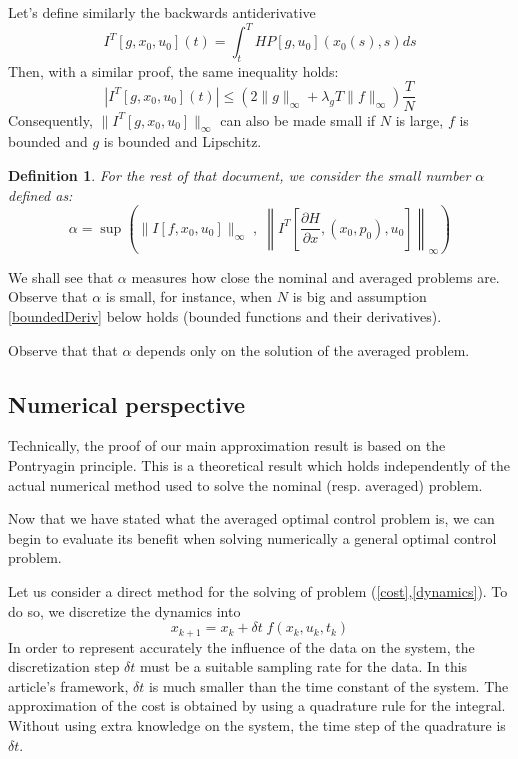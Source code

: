 \documentclass[a4paper,10pt]{article}
\newtheorem{definition}{Definition}
\begin{document}
Let's define similarly the backwards antiderivative
\begin{equation}
    I^{T}[g,x_{0},u_{0}](t)=\int_{t}^{T}HP[g,u_{0}](x_{0}(s),s)ds
    \label{ITcontrol}
\end{equation}
Then, with a similar proof, the same inequality holds:
\begin{equation}
    |I^{T}[g,x_{0},u_{0}](t)| \le (2 \|g\|_{\infty} + \lambda_{g}T  \|f\|_{\infty})\frac{T}{N}
    \label{boundIcontrol2}
\end{equation}
Consequently, $\|I^{T}[g,x_{0},u_{0}]\|_{\infty}$ can also be made 
small  if $N$ is large, $f$ is bounded and $g$ is bounded and Lipschitz.

\begin{definition}\label{alphadef}
    For the rest of that document, we consider the small number $\alpha$ 
    defined as:
    \begin{equation}
            \alpha = \sup  
                        \left(
              \| I[f,x_{0},u_{0}]\|_{\infty} \; , \;
                  \left\|I^{T}\left[\frac{\partial H}{\partial x},(x_{0},p_{0}),u_{0}\right]\right\| _{\infty}
                 \right) 
        \label{alpha}
    \end{equation}
\end{definition}

We shall see that $\alpha$ measures how close the nominal and 
averaged problems are. Observe that $\alpha$ is small, for instance, when $N$ is big and assumption 
\ref{boundedDeriv} below holds (bounded functions and their derivatives).

Observe that that $\alpha$ depends only on the solution of the 
averaged problem.

\subsection{Numerical perspective}\label{numericalSection}
Technically, the proof of our main approximation result is based on 
the Pontryagin principle. This is a theoretical result which holds 
independently of the actual numerical method used to solve the nominal (resp. 
averaged) problem.

Now that we have stated what the averaged optimal control problem is, 
we can begin to evaluate its benefit when solving numerically a 
general 
optimal control problem.

Let us consider a direct method for the solving of problem 
(\ref{cost},\ref{dynamics}). To do so, we discretize the dynamics into
\begin{equation}
	x_{k+1}=x_{k}+\delta t \; f(x_{k},u_{k},t_{k})
	\label{discretized}
\end{equation}
In order to represent accurately the influence of the data on the 
system, the discretization step $\delta t$ must be a suitable 
sampling rate for the data. In this article's framework, $\delta t$ is 
much smaller than the time constant of the system. The approximation 
of the cost is obtained by using a quadrature rule for the integral. 
Without using extra knowledge on the system, the time step of 
the quadrature is $\delta t$.
\end{document}
